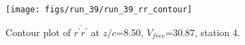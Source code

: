 \begin{figure}[H]
\centering
\texttt{[image: figs/run\_39/run\_39\_rr\_contour]}
\caption{Contour plot of $\overline{r^\prime r^\prime}$ at $z/c$=8.50, $V_{free}$=30.87, station 4.}
\label{fig:run_39_rr_contour}
\end{figure}


